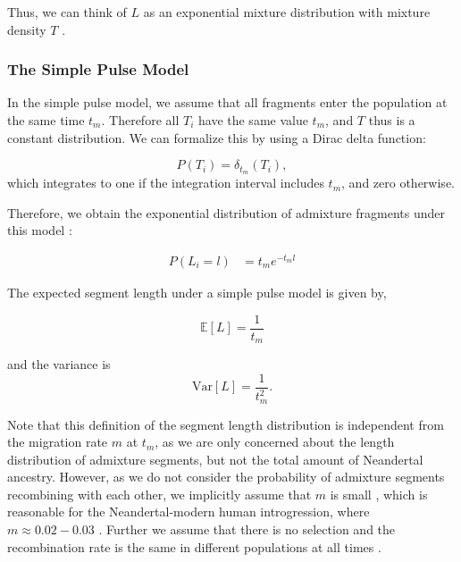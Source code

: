 \documentclass[]{article}
\begin{document}
Thus, we can think of $L$ as an exponential mixture distribution with mixture density $T$ \citep{ralph_geography_2013, zhou_modeling_2017}. 

\subsubsection{The Simple Pulse Model}\label{The Simple Pulse Model}


In the simple pulse model, we assume that all fragments enter the population at the same time $t_m$. Therefore all $T_i$ have the same value $t_m$, and $T$ thus is a constant distribution. We can formalize this by using a Dirac delta function:

\begin{equation}
\label{eq:RV_simple_pulse}
  P(T_i)=\delta_{t_m}(T_i),
\end{equation} 
which integrates to one if the integration interval includes $t_m$, and zero otherwise.


Therefore, we obtain the exponential distribution of admixture fragments under this model \citep[e.g.][]{pool_inference_2009}:

\begin{equation}
\begin{split}
\label{eq:Likelihood_function_simple_pulse}
    P(L_i=l) &= t_me^{-t_m l}
\end{split}
\end{equation}

The expected segment length under a simple pulse model is given by,

\begin{equation}
\label{eq:Expected_l_simple_pulse}
    \mathbb{E}[L]=\frac{1}{t_m}
\end{equation}

and the variance is
\begin{equation}
\label{eq:Expected_v_simple_pulse}
    \text{Var}[L]=\frac{1}{t_m^2} \text{.}
\end{equation}

Note that this definition of the segment length distribution is independent from the migration rate $m$ at $t_m$, as we are only concerned about the length distribution of admixture segments, but not the total amount of Neandertal ancestry. However, as we do not consider the  probability of admixture segments recombining with each other, we implicitly assume that $m$ is small \citep{gravel_population_2012, liang_lengths_2014}, which is reasonable for the Neandertal-modern human introgression, where $m \approx 0.02 - 0.03$ . Further we assume that there is no selection \citep{shchur_distribution_2019} and the recombination rate is the same in different populations at all times \citep{gravel_population_2012}.
\end{document}
